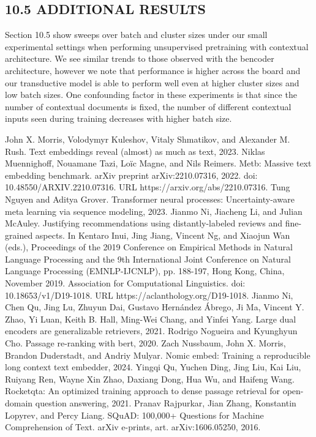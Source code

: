 \subsection*{10.5 ADDITIONAL RESULTS}
Section 10.5 show sweeps over batch and cluster sizes under our small experimental settings when performing unsupervised pretraining with contextual architecture. We see similar trends to those observed with the bencoder architecture, however we note that performance is higher across the board and our transductive model is able to perform well even at higher cluster sizes and low batch sizes.
One confounding factor in these experiments is that since the number of contextual documents is fixed, the number of different contextual inputs seen during training decreases with higher batch size.

John X. Morris, Volodymyr Kuleshov, Vitaly Shmatikov, and Alexander M. Rush. Text embeddings reveal (almost) as much as text, 2023.
Niklas Muennighoff, Nouamane Tazi, Loïc Magne, and Nils Reimers. Metb: Massive text embedding benchmark. arXiv preprint arXiv:2210.07316, 2022. doi: 10.48550/ARXIV.2210.07316. URL https://arxiv.org/abs/2210.07316.
Tung Nguyen and Aditya Grover. Transformer neural processes: Uncertainty-aware meta learning via sequence modeling, 2023.
Jianmo Ni, Jiacheng Li, and Julian McAuley. Justifying recommendations using distantly-labeled reviews and fine-grained aspects. In Kentaro Inui, Jing Jiang, Vincent Ng, and Xiaojun Wan (eds.), Proceedings of the 2019 Conference on Empirical Methods in Natural Language Processing and the 9th International Joint Conference on Natural Language Processing (EMNLP-IJCNLP), pp. 188-197, Hong Kong, China, November 2019. Association for Computational Linguistics. doi: 10.18653/v1/D19-1018. URL https://aclanthology.org/D19-1018.
Jianmo Ni, Chen Qu, Jing Lu, Zhuyun Dai, Gustavo Hernández Ábrego, Ji Ma, Vincent Y. Zhao, Yi Luan, Keith B. Hall, Ming-Wei Chang, and Yinfei Yang. Large dual encoders are generalizable retrievers, 2021.
Rodrigo Nogueira and Kyunghyun Cho. Passage re-ranking with bert, 2020.
Zach Nussbaum, John X. Morris, Brandon Duderstadt, and Andriy Mulyar. Nomic embed: Training a reproducible long context text embedder, 2024.
Yingqi Qu, Yuchen Ding, Jing Liu, Kai Liu, Ruiyang Ren, Wayne Xin Zhao, Daxiang Dong, Hua Wu, and Haifeng Wang. Rocketqta: An optimized training approach to dense passage retrieval for open-domain question answering, 2021.
Pranav Rajpurkar, Jian Zhang, Konstantin Lopyrev, and Percy Liang. SQuAD: 100,000+ Questions for Machine Comprehension of Text. arXiv e-prints, art. arXiv:1606.05250, 2016.
